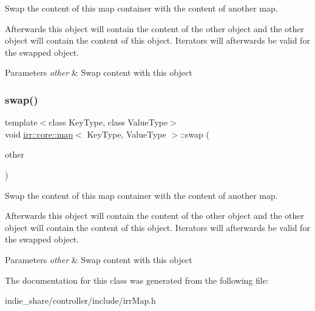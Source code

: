 Swap the content of this map container with the content of another map. 

Afterwards this object will contain the content of the other object and the other object will contain the content of this object. Iterators will afterwards be valid for the swapped object. 
\begin{DoxyParams}{Parameters}
{\em other} & Swap content with this object \\
\hline
\end{DoxyParams}
\mbox{\label{classirr_1_1core_1_1map_a411cde5df191c16616e20eb7027b9a20}} 
\subsubsection{\texorpdfstring{swap()}{swap()}\hspace{0.1cm}{\footnotesize\ttfamily [2/2]}}
{\footnotesize\ttfamily template$<$class Key\+Type, class Value\+Type$>$ \\
void \hyperlink{classirr_1_1core_1_1map}{irr\+::core\+::map}$<$ Key\+Type, Value\+Type $>$\+::swap (\begin{DoxyParamCaption}\item[{\hyperlink{classirr_1_1core_1_1map}{map}$<$ Key\+Type, Value\+Type $>$ \&}]{other }\end{DoxyParamCaption})\hspace{0.3cm}{\ttfamily [inline]}}



Swap the content of this map container with the content of another map. 

Afterwards this object will contain the content of the other object and the other object will contain the content of this object. Iterators will afterwards be valid for the swapped object. 
\begin{DoxyParams}{Parameters}
{\em other} & Swap content with this object \\
\hline
\end{DoxyParams}


The documentation for this class was generated from the following file\+:\begin{DoxyCompactItemize}
\item 
indie\+\_\+share/controller/include/irr\+Map.\+h\end{DoxyCompactItemize}
